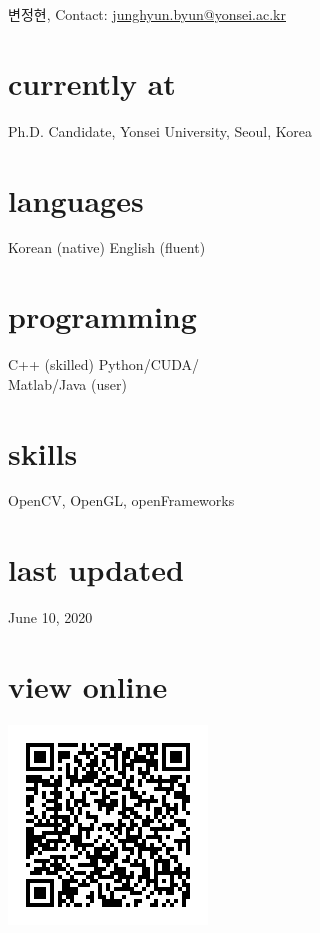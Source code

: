 \documentclass[]{friggeri-cv}
\begin{document}
       { 변정현, Contact:
       \href{mailto:junghyun.byun@yonsei.ac.kr}{junghyun.byun@yonsei.ac.kr}}

\begin{aside}
  \section{currently at}
    Ph.D. Candidate, Yonsei University, Seoul, Korea
  \section{languages}
    Korean (native)
    English (fluent)
  \section{programming}
    C++ (skilled)
    Python/CUDA/\\Matlab/Java (user)
  \section{skills}
    OpenCV, OpenGL, openFrameworks
  \section{last updated}
    June 10, 2020
  \section{view online}
    \includegraphics[width=\textwidth]{data/cv_qr_code}
\end{aside}
\end{document}
